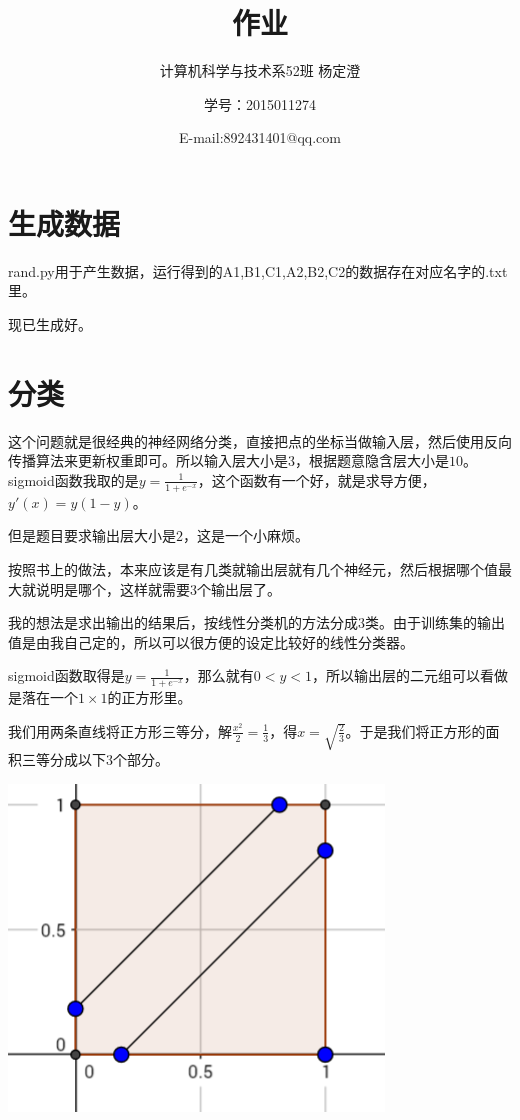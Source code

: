 \documentclass{ctexart}
\begin{document}
\title{作业}
\author{计算机科学与技术系52班 杨定澄 \and 学号：2015011274 \and E-mail:892431401@qq.com}
\date{}
\maketitle
\section{生成数据}
rand.py用于产生数据，运行得到的A1,B1,C1,A2,B2,C2的数据存在对应名字的.txt里。

现已生成好。
\section{分类}
这个问题就是很经典的神经网络分类，直接把点的坐标当做输入层，然后使用反向传播算法来更新权重即可。所以输入层大小是$3$，根据题意隐含层大小是$10$。sigmoid函数我取的是$y=\frac{1}{1+e^{-x}}$，这个函数有一个好，就是求导方便，$y'(x)=y(1-y)$。

但是题目要求输出层大小是$2$，这是一个小麻烦。

按照书上的做法，本来应该是有几类就输出层就有几个神经元，然后根据哪个值最大就说明是哪个，这样就需要$3$个输出层了。

我的想法是求出输出的结果后，按线性分类机的方法分成$3$类。由于训练集的输出值是由我自己定的，所以可以很方便的设定比较好的线性分类器。

sigmoid函数取得是$y=\frac{1}{1+e^{-x}}$，那么就有$0<y<1$，所以输出层的二元组可以看做是落在一个$1 \times 1$的正方形里。

我们用两条直线将正方形三等分，解$\frac{x^2}{2}=\frac{1}{3}$，得$x=\sqrt{\frac{2}{3}}$。于是我们将正方形的面积三等分成以下$3$个部分。

\includegraphics{2.png}
\end{document}
